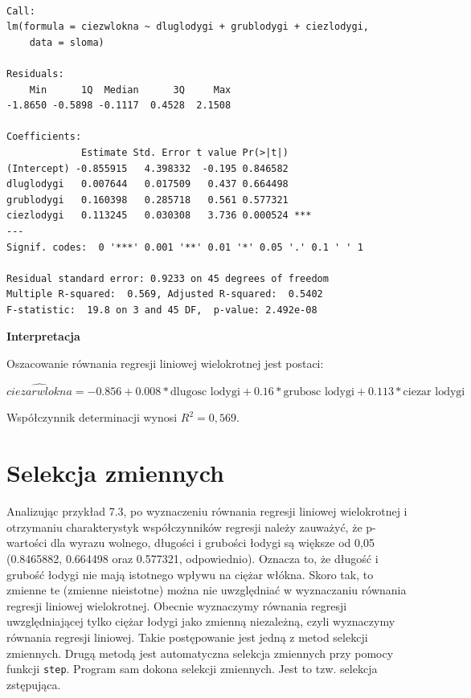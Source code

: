 \documentclass[12pt,B5paper,]{book}
\begin{document}
\begin{verbatim}

Call:
lm(formula = ciezwlokna ~ dluglodygi + grublodygi + ciezlodygi, 
    data = sloma)

Residuals:
    Min      1Q  Median      3Q     Max 
-1.8650 -0.5898 -0.1117  0.4528  2.1508 

Coefficients:
             Estimate Std. Error t value Pr(>|t|)    
(Intercept) -0.855915   4.398332  -0.195 0.846582    
dluglodygi   0.007644   0.017509   0.437 0.664498    
grublodygi   0.160398   0.285718   0.561 0.577321    
ciezlodygi   0.113245   0.030308   3.736 0.000524 ***
---
Signif. codes:  0 '***' 0.001 '**' 0.01 '*' 0.05 '.' 0.1 ' ' 1

Residual standard error: 0.9233 on 45 degrees of freedom
Multiple R-squared:  0.569, Adjusted R-squared:  0.5402 
F-statistic:  19.8 on 3 and 45 DF,  p-value: 2.492e-08
\end{verbatim}

\vspace{0.4cm}

\textbf{Interpretacja}

Oszacowanie równania regresji liniowej wielokrotnej jest postaci:

\(\widehat{ciezar wlokna} = -0.856+0.008*\textrm{dlugosc lodygi} + 0.16*\textrm{grubosc lodygi}+0.113*\textrm{ciezar lodygi}\)

Współczynnik determinacji wynosi \(R^2=0,569\).

\section{Selekcja zmiennych}\label{selekcja-zmiennych}

Analizując przykład 7.3, po wyznaczeniu równania regresji liniowej
wielokrotnej i otrzymaniu charakterystyk współczynników regresji należy
zauważyć, że p-wartości dla wyrazu wolnego, długości i grubości łodygi
są większe od 0,05 (0.8465882, 0.664498 oraz 0.577321, odpowiednio).
Oznacza to, że długość i grubość łodygi nie mają istotnego wpływu na
ciężar włókna. Skoro tak, to zmienne te (zmienne nieistotne) można nie
uwzględniać w wyznaczaniu równania regresji liniowej wielokrotnej.
Obecnie wyznaczymy równania regresji uwzględniającej tylko ciężar łodygi
jako zmienną niezależną, czyli wyznaczymy równania regresji liniowej.
Takie postępowanie jest jedną z metod selekcji zmiennych. Drugą metodą
jest automatyczna selekcja zmiennych przy pomocy funkcji \texttt{step}.
Program sam dokona selekcji zmiennych. Jest to tzw. selekcja zstępująca.
\end{document}
